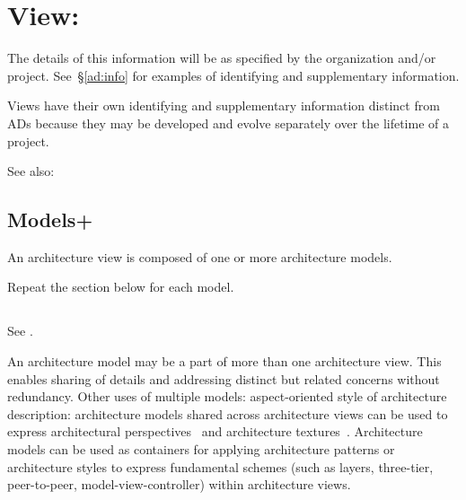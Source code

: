 \documentclass[10pt,oneside]{report}
\begin{document}
\section{View: }



The details of this information will be as specified by the
organization and/or project. See~\S\ref{ad:info} for examples of
identifying and supplementary information.

Views have their own identifying and supplementary information
distinct from ADs because they may be developed and evolve separately
over the lifetime of a project.


See also: 


\subsection{Models+}

An architecture view is composed of one or more architecture models.



Repeat the section below for each model.

\subsection{}



See .

An architecture model may be a part of more than one architecture
view. This enables sharing of details and addressing distinct but
related concerns without redundancy. Other uses of multiple models:
aspect-oriented style of architecture description: architecture models
shared across architecture views can be used to express architectural
perspectives~\cite{Rozanski-Woods:2011} and architecture
textures~\cite{Ran:2000}. Architecture models can be used as
containers for applying architecture patterns or architecture styles
to express fundamental schemes (such as layers, three-tier,
peer-to-peer, model-view-controller) within architecture views.
\end{document}

